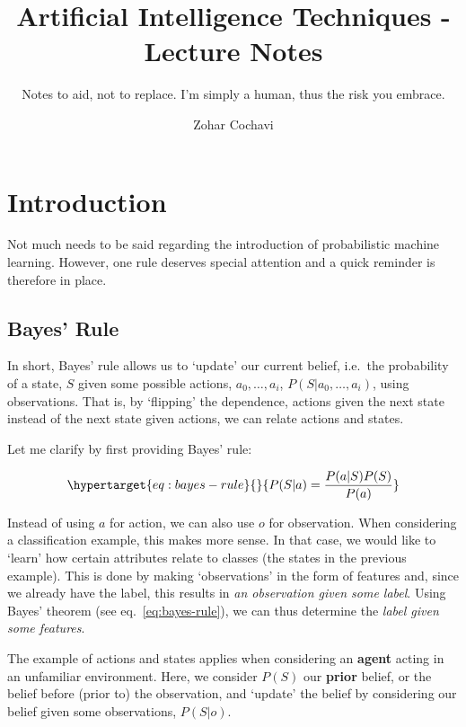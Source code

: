 \documentclass[
]{book}
\title{Artificial Intelligence Techniques - Lecture Notes}
\subtitle{Notes to aid, not to replace. I'm simply a human, thus the
risk you embrace.}
\author{Zohar Cochavi}
\date{}
\begin{document}
\frontmatter
\maketitle

\mainmatter
\hypertarget{introduction}{%
\chapter{Introduction}\label{introduction}}

Not much needs to be said regarding the introduction of probabilistic
machine learning. However, one rule deserves special attention and a
quick reminder is therefore in place.

\hypertarget{bayes-rule}{%
\section{Bayes' Rule}\label{bayes-rule}}

In short, Bayes' rule allows us to `update' our current belief, i.e.~the
probability of a state, \(S\) given some possible actions,
\(a_0, \ldots, a_i\), \(P(S | a_0, \ldots, a_i)\), using observations.
That is, by `flipping' the dependence, actions given the next state
instead of the next state given actions, we can relate actions and
states.

Let me clarify by first providing Bayes' rule:

\begin{equation}\protect\hypertarget{eq:bayes-rule}{}{
P(S|a) = \frac{P(a|S)P(S)}{P(a)}
}\label{eq:bayes-rule}\end{equation}

Instead of using \(a\) for action, we can also use \(o\) for
observation. When considering a classification example, this makes more
sense. In that case, we would like to `learn' how certain attributes
relate to classes (the states in the previous example). This is done by
making `observations' in the form of features and, since we already have
the label, this results in \emph{an observation given some label}. Using
Bayes' theorem (see eq.~\ref{eq:bayes-rule}), we can thus determine the
\emph{label given some features}.

The example of actions and states applies when considering an
\textbf{agent} acting in an unfamiliar environment. Here, we consider
\(P(S)\) our \textbf{prior} belief, or the belief before (prior to) the
observation, and `update' the belief by considering our belief given
some observations, \(P(S|o)\).
\end{document}
